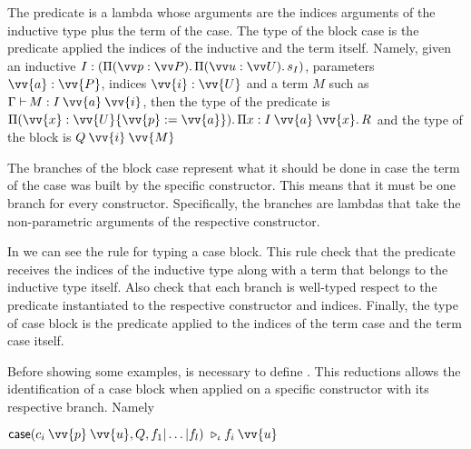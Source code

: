 The predicate is a lambda whose arguments are the indices arguments of the inductive type plus the term of
the case. The type of the block case is the predicate applied the indices of the inductive and the term
itself.
Namely, given an inductive $\typing{\IN}{(\vvDepArrow{\IPN}{\IP}{\vvDepArrow{\IIN}{\II}{s_\IN}})}$, parameters
$\typing{\vv{a}}{\vv{\IP}}$, indices $\typing{\vv{i}}{\vv{\II}}$ and a term $M$ such as
$\ctyping{M}{\app{\IN}{\vv{a}}{\vv{i}}}$, then
the type of the predicate \PredN{} is 
$\enDepArrow{\vv{x}}{\subst{\vv{\II}}{\vv{\IPN}}{\vv{a}}}{\depArrow{x}{\app{\IN}{\vv{a}}{\vv{x}}}{R}}$
and the type of the block is $\app{Q}{\vv{i}}{\vv{M}}$


The branches of the block case represent what it should be done in case the term of the case was built by the 
specific constructor. This means that it must be one branch for every constructor. Specifically, the branches
are lambdas that take the non-parametric arguments of the respective constructor. 

In  we can see the rule for typing a case block. This rule check that the 
predicate receives the indices of the inductive type along with a term that belongs to the inductive type itself.
Also check that each branch is well-typed respect to the predicate instantiated to the respective constructor 
and indices. Finally, the type of case block is the predicate applied to the indices of the term case 
and the term case itself.

Before showing some examples, is necessary to define \iotaRed{}. This reductions allows the identification
of a case block when applied on a specific constructor with its respective branch. Namely
\begin{center}
$\reductionIota{\IndElim{\app{\CN_i}{\vv{\IPN}}{\vv{\IIN}}}{\PredN}{f_1|\dots | f_l}}{\app{f_i}{\vv{\IIN}}}$
\end{center}

